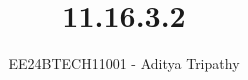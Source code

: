 \documentclass[journal]{IEEEtran}
\begin{document}

\vspace{3cm}

\title{11.16.3.2}
\author{EE24BTECH11001 - Aditya Tripathy}
 \maketitle
{\let\newpage\relax\maketitle}

\renewcommand{\thefigure}{\theenumi}
\renewcommand{\thetable}{\theenumi}
\setlength{\intextsep}{10pt} %


\renewcommand{\thetable}{\theenumi}
\end{document}
